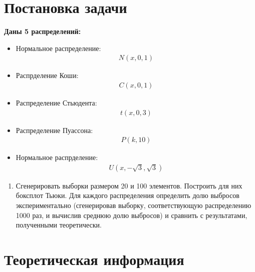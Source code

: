 \section{Постановка задачи}
\textbf{Даны 5 распределений:}
\begin{itemize}
\item Нормальное распределение: \begin{gather*}N(x,0,1)\end{gather*}
\item Распрделение Коши: \begin{gather*}C(x,0,1)\end{gather*}
\item Распределение Стьюдента:\begin{gather*}t(x,0,3)\end{gather*}
\item Распределение Пуассона: \begin{gather*}P(k,10)\end{gather*}
\item Нормальное распрделение: \begin{gather*}U(x,-\sqrt{3}, \sqrt{3})\end{gather*}
\end{itemize}
\begin{enumerate}
    \item Сгенерировать выборки размером 20 и 100 элементов.
Построить для них боксплот Тьюки. Для каждого распределения определить долю выбросов экспериментально (сгенерировав выборку, соответствующую распределению 1000 раз, и вычислив среднюю долю выбросов) и сравнить с результатами, полученными теоретически.
\end{enumerate}


\section{Теоретическая информация}


